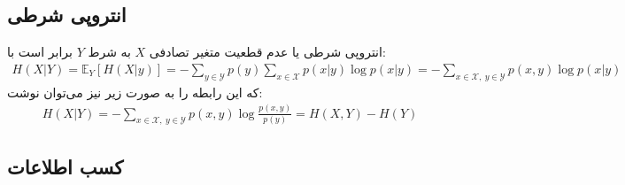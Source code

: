\subsection{انتروپی شرطی}

انتروپی شرطی یا عدم قطعیت متغیر تصادفی $X$ به شرط $Y$ برابر است با:
\begin{align*}
    H(X|Y) = \mathbb{E}_Y\left[H(X|y)\right] = -\sum_{y\in \mathcal{Y}}p(y)\sum_{x\in \mathcal{X}}p(x|y)\log p(x|y)= - \sum_{x\in \mathcal{X},~ y \in \mathcal{Y}}p(x,y) \log p(x|y) 
\end{align*}
که این رابطه را به صورت زیر نیز می‌توان نوشت:
\begin{align*}
    H(X|Y) =  - \sum_{x\in \mathcal{X},~ y \in \mathcal{Y}}p(x,y) \log \frac{p(x,y)}{p(y)} = H(X,Y) - H(Y)
\end{align*}

\subsection{کسب اطلاعات}

